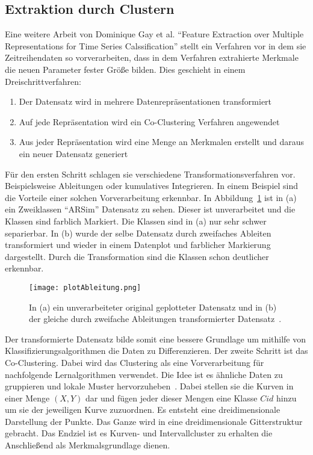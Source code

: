 \subsection{Extraktion durch Clustern}

Eine weitere Arbeit von Dominique Gay et al. \enquote{Feature Extraction over Multiple Representations for Time Series Calssification} stellt ein Verfahren vor in dem sie Zeitreihendaten so vorverarbeiten, dass in dem Verfahren extrahierte Merkmale die neuen Parameter fester Größe bilden. Dies geschieht in einem Dreischrittverfahren:

\begin{enumerate}
  \item Der Datensatz wird in mehrere Datenrepräsentationen transformiert
  \item Auf jede Repräsentation wird ein Co-Clustering Verfahren angewendet
  \item Aus jeder Repräsentation wird eine Menge an Merkmalen erstellt und daraus ein neuer Datensatz generiert
\end{enumerate}

Für den ersten Schritt schlagen sie verschiedene Transformationsverfahren vor. Beispielsweise Ableitungen oder kumulatives Integrieren. In einem Beispiel sind die Vorteile einer solchen Vorverarbeitung erkennbar. In Abbildung\ \ref{fig:derivative} ist in (a) ein Zweiklassen \enquote{ARSim} Datensatz zu sehen. Dieser ist unverarbeitet und die Klassen sind farblich Markiert. Die Klassen sind in (a) nur sehr schwer separierbar. In (b) wurde der selbe Datensatz durch zweifaches Ableiten transformiert und wieder in einem Datenplot und farblicher Markierung dargestellt. Durch die Transformation sind die Klassen schon deutlicher erkennbar.

\begin{figure}
  \centering
  \texttt{[image: plotAbleitung.png]}
  \caption{In (a) ein unverarbeiteter original geplotteter Datensatz und in (b) der gleiche durch zweifache Ableitungen transformierter Datensatz~\cite{Gay2013}.}
  \label{fig:derivative}
\end{figure}

Der transformierte Datensatz bilde somit eine bessere Grundlage um mithilfe von Klassifizierungsalgorithmen die Daten zu Differenzieren. 
Der zweite Schritt ist das Co-Clustering. 
Dabei wird das Clustering als eine Vorverarbeitung für nachfolgende Lernalgorithmen verwendet. 
Die Idee ist es ähnliche Daten zu gruppieren und lokale Muster hervorzuheben~\cite{gay2013feature}. Dabei stellen sie die Kurven in einer Menge $(X,Y)$ dar und fügen jeder dieser Mengen eine Klasse $Cid$ hinzu um sie der jeweiligen Kurve zuzuordnen. Es entsteht eine dreidimensionale Darstellung der Punkte. Das Ganze wird in eine dreidimensionale Gitterstruktur gebracht. Das Endziel ist es Kurven- und Intervallcluster zu erhalten die Anschließend als Merkmalsgrundlage dienen. 

